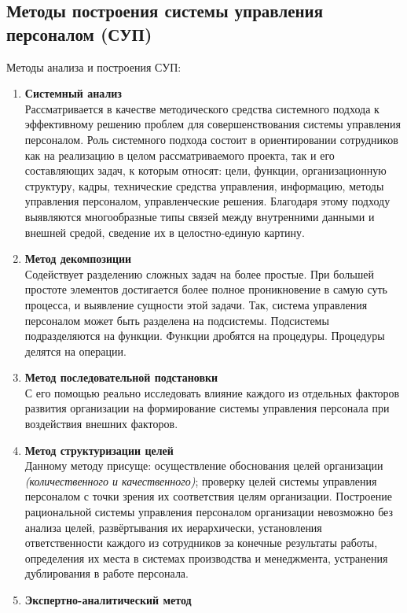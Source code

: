 \documentclass[a4paper,12pt,oneside,final]{extarticle}
\numberwithin{equation}{section}
\begin{document}
\subsection{Методы построения системы управления персоналом (СУП)}
Методы анализа и построения СУП: 
\begin{enumerate}
	\item \textbf{Системный анализ} \\ 
	Рассматривается в качестве методического средства системного подхода к эффективному решению проблем для совершенствования системы управления персоналом. 
	Роль системного подхода состоит в ориентировании сотрудников как на реализацию в целом рассматриваемого проекта, так и его составляющих задач, к которым относят: цели, функции, организационную структуру, кадры, технические средства управления, информацию, методы управления персоналом, управленческие решения.
	Благодаря этому подходу выявляются многообразные типы связей между внутренними данными и внешней средой, сведение их в целостно-единую картину.
	\item \textbf{Метод декомпозиции} \\ 
	Содействует разделению сложных задач на более простые.
	При большей простоте элементов достигается более полное проникновение в самую суть процесса, и выявление сущности этой задачи. 
	Так, система управления персоналом может быть разделена на подсистемы. 
	Подсистемы подразделяются на функции. 
	Функции дробятся на процедуры. 
	Процедуры делятся на операции.
	\item \textbf{Метод последовательной подстановки} \\ 
	С его помощью реально исследовать влияние каждого из отдельных факторов развития организации на формирование системы управления персонала при воздействия внешних факторов.
	\item \textbf{Метод структуризации целей} \\ 
	Данному методу присуще: осуществление обоснования целей организации \textit{(количественного и качественного)}; проверку целей системы управления персоналом с точки зрения их соответствия целям организации. 
	Построение рациональной системы управления персоналом организации невозможно без анализа целей, развёртывания их иерархически, установления ответственности каждого из сотрудников за конечные результаты работы, определения их места в системах производства и менеджмента, устранения дублирования в работе персонала.
	\item \textbf{Экспертно-аналитический метод} \\ 

\end{enumerate}
\end{document}
